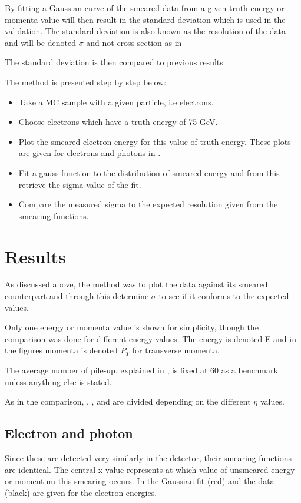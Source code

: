 By fitting a Gaussian curve of the smeared data from a given truth energy or momenta value will then result in the standard deviation which is used in the validation. The standard deviation is also known as the resolution of the data and will be denoted $\sigma$ and not cross-section as in 

The standard deviation is then compared to previous results \citep{ATL-PHYS-PUB-2013-004}.

The method is presented step by step below:
\begin{itemize}
\item Take a MC sample with a given particle, i.e electrons.
\item Choose electrons which have a truth energy of 75 GeV.
\item Plot the smeared electron energy for this value of truth energy. These plots are given for electrons and photons in .
\item Fit a gauss function to the distribution of smeared energy and from this retrieve the sigma value of the fit.
\item Compare the measured sigma to the expected resolution given from the smearing functions.
\end{itemize}

\newpage
\section{Results}\label{cha:vali:sec:results}
As discussed above, the method was to plot the data against its smeared counterpart and through this determine $\sigma$ to see if it conforms to the expected values.

Only one energy or momenta value is shown for simplicity, though the comparison was done for different energy values. The energy is denoted E and in the figures momenta is denoted $P_T$ for transverse momenta.

The average number of pile-up, explained in , is fixed at 60 as a benchmark unless anything else is stated.

As in the comparison, , ,  and  are divided depending on the different $\eta$ values.
\newpage
\subsection{Electron and photon}\label{cha:vali:sec:res:subsec:elph}
Since these are detected very similarly in the detector, their smearing functions are identical.
The central x value represents at which value of unsmeared energy or momentum this smearing occurs. In  the Gaussian fit (red) and the data (black) are given for the electron energies.

